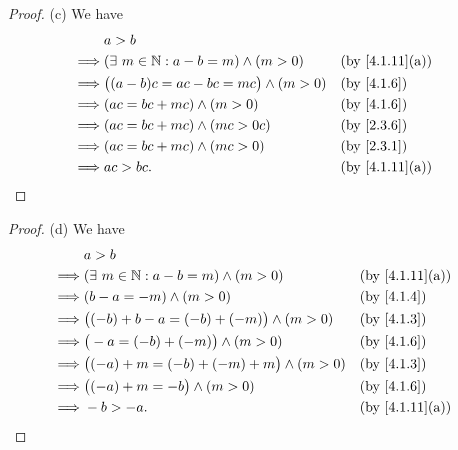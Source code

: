 \begin{proof}{(c)}
  We have
  \begin{align*}
             & a > b                                                                             \\
    \implies & (\exists\ m \in \N : a - b = m) \land (m > 0)   &  & \text{(by \cref{4.1.11}(a))} \\
    \implies & \big((a - b)c = ac - bc = mc\big) \land (m > 0) &  & \text{(by \cref{4.1.6})}     \\
    \implies & (ac = bc + mc) \land (m > 0)                    &  & \text{(by \cref{4.1.6})}     \\
    \implies & (ac = bc + mc) \land (mc > 0c)                  &  & \text{(by \cref{2.3.6})}     \\
    \implies & (ac = bc + mc) \land (mc > 0)                   &  & \text{(by \cref{2.3.1})}     \\
    \implies & ac > bc.                                        &  & \text{(by \cref{4.1.11}(a))}
  \end{align*}
\end{proof}

\begin{proof}{(d)}
  We have
  \begin{align*}
             & a > b                                                                                \\
    \implies & (\exists\ m \in \N : a - b = m) \land (m > 0)      &  & \text{(by \cref{4.1.11}(a))} \\
    \implies & (b - a = -m) \land (m > 0)                         &  & \text{(by \cref{4.1.4})}     \\
    \implies & \big((-b) + b - a = (-b) + (-m)\big) \land (m > 0) &  & \text{(by \cref{4.1.3})}     \\
    \implies & \big(-a = (-b) + (-m)\big) \land (m > 0)           &  & \text{(by \cref{4.1.6})}     \\
    \implies & \big((-a) + m = (-b) + (-m) + m\big) \land (m > 0) &  & \text{(by \cref{4.1.3})}     \\
    \implies & \big((-a) + m = -b\big) \land (m > 0)              &  & \text{(by \cref{4.1.6})}     \\
    \implies & -b > -a.                                           &  & \text{(by \cref{4.1.11}(a))}
  \end{align*}
\end{proof}

